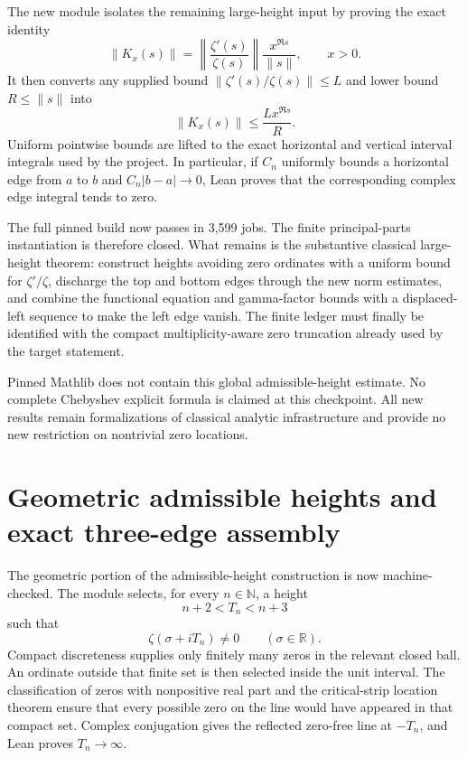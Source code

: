 \documentclass[11pt,a4paper]{article}
\begin{document}
The new module  isolates the
remaining large-height input by proving the exact identity
\[
  \lVert K_x(s)\rVert
  =\left\lVert\frac{\zeta'(s)}{\zeta(s)}\right\rVert
    \frac{x^{\Re s}}{\lVert s\rVert},\qquad x>0.
\]
It then converts any supplied bound
$\lVert\zeta'(s)/\zeta(s)\rVert\leq L$ and lower bound
$R\leq\lVert s\rVert$ into
\[
  \lVert K_x(s)\rVert\leq \frac{Lx^{\Re s}}{R}.
\]
Uniform pointwise bounds are lifted to the exact horizontal and vertical
interval integrals used by the project.  In particular, if $C_n$ uniformly
bounds a horizontal edge from $a$ to $b$ and
$C_n|b-a|\to0$, Lean proves that the corresponding complex edge integral
tends to zero.

The full pinned build now passes in 3,599 jobs.  The finite principal-parts
instantiation is therefore closed.  What remains is the substantive classical
large-height theorem: construct heights avoiding zero ordinates with a uniform
bound for $\zeta'/\zeta$, discharge the top and bottom edges through the new
norm estimates, and combine the functional equation and gamma-factor bounds
with a displaced-left sequence to make the left edge vanish.  The finite
ledger must finally be identified with the compact multiplicity-aware zero
truncation already used by the target statement.

Pinned Mathlib does not contain this global admissible-height estimate.  No
complete Chebyshev explicit formula is claimed at this checkpoint.  All new
results remain formalizations of classical analytic infrastructure and provide
no new restriction on nontrivial zero locations.

\section{Geometric admissible heights and exact three-edge assembly}

The geometric portion of the admissible-height construction is now
machine-checked.  The module
 selects, for every
$n\in\mathbb N$, a height
\[
  n+2<T_n<n+3
\]
such that
\[
  \zeta(\sigma+iT_n)\ne0\qquad(\sigma\in\mathbb R).
\]
Compact discreteness supplies only finitely many zeros in the relevant closed
ball.  An ordinate outside that finite set is then selected inside the unit
interval.  The classification of zeros with nonpositive real part and the
critical-strip location theorem ensure that every possible zero on the line
would have appeared in that compact set.  Complex conjugation gives the
reflected zero-free line at $-T_n$, and Lean proves $T_n\to\infty$.
\end{document}
